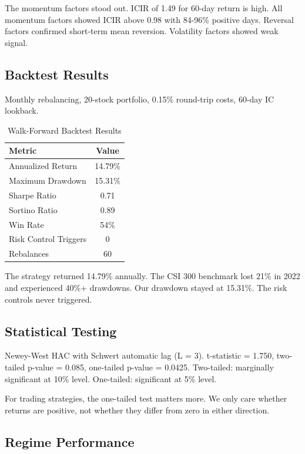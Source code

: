 The momentum factors stood out. ICIR of 1.49 for 60-day return is high. All momentum factors showed ICIR above 0.98 with 84-96\% positive days. Reversal factors confirmed short-term mean reversion. Volatility factors showed weak signal.

\subsection{Backtest Results}

Monthly rebalancing, 20-stock portfolio, 0.15\% round-trip costs, 60-day IC lookback.

\begin{table}[h]
\centering
\caption{Walk-Forward Backtest Results}
\label{tab:backtest}
\begin{tabular}{lc}
\toprule
Metric & Value \\
\midrule
Annualized Return & 14.79\% \\
Maximum Drawdown & 15.31\% \\
Sharpe Ratio & 0.71 \\
Sortino Ratio & 0.89 \\
Win Rate & 54\% \\
Risk Control Triggers & 0 \\
Rebalances & 60 \\
\bottomrule
\end{tabular}
\end{table}

The strategy returned 14.79\% annually. The CSI 300 benchmark lost 21\% in 2022 and experienced 40\%+ drawdowns. Our drawdown stayed at 15.31\%. The risk controls never triggered.

\subsection{Statistical Testing}

Newey-West HAC with Schwert automatic lag (L = 3). t-statistic = 1.750, two-tailed p-value = 0.085, one-tailed p-value = 0.0425. Two-tailed: marginally significant at 10\% level. One-tailed: significant at 5\% level.

For trading strategies, the one-tailed test matters more. We only care whether returns are positive, not whether they differ from zero in either direction.

\subsection{Regime Performance}

